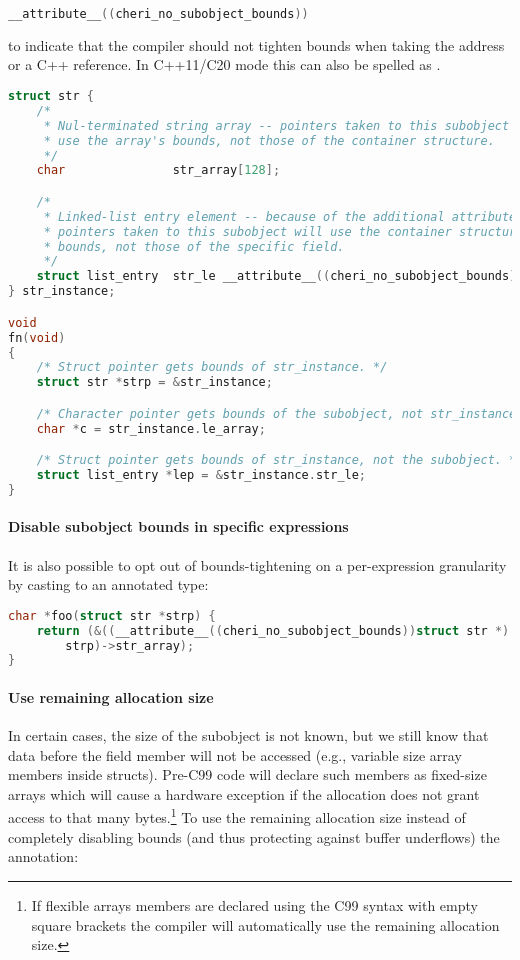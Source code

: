 \documentclass[12pt,twoside,openright,a4paper]{article}
\newcommand{\ccode}[1]{{\small\ttfamily{#1}}}
\newcommand{\cxxcode}[1]{{\ccode{#1}}}
\begin{document}
\begin{lstlisting}[language={C}]
__attribute__((cheri_no_subobject_bounds))
\end{lstlisting}

\noindent
to indicate that the compiler should not tighten bounds when taking the address or a C++ reference. In C++11/C20 mode this can also be spelled as \cxxcode{[[cheri::no\_subobject\_bounds]]}.

\begin{lstlisting}[language={C}]
struct str {
    /*
     * Nul-terminated string array -- pointers taken to this subobject will
     * use the array's bounds, not those of the container structure.
     */
    char               str_array[128];

    /*
     * Linked-list entry element -- because of the additional attribute,
     * pointers taken to this subobject will use the container structure's
     * bounds, not those of the specific field.
     */
    struct list_entry  str_le __attribute__((cheri_no_subobject_bounds));
} str_instance;

void
fn(void)
{
    /* Struct pointer gets bounds of str_instance. */
    struct str *strp = &str_instance;

    /* Character pointer gets bounds of the subobject, not str_instance. */
    char *c = str_instance.le_array;

    /* Struct pointer gets bounds of str_instance, not the subobject. */
    struct list_entry *lep = &str_instance.str_le;
}
\end{lstlisting}

\paragraph{Disable subobject bounds in specific expressions}
It is also possible to opt out of bounds-tightening on a per-expression
granularity by casting to an annotated type:

\begin{lstlisting}[language={C}]
char *foo(struct str *strp) {
    return (&((__attribute__((cheri_no_subobject_bounds))struct str *)
        strp)->str_array);
}
\end{lstlisting}

\paragraph{Use remaining allocation size}
In certain cases, the size of the subobject is not known, but we still know that data
before the field member will not be accessed (e.g., variable size array members
inside structs).
Pre-C99 code will declare such members as fixed-size arrays which will cause
a hardware exception if the allocation does not grant access to that many bytes.\footnote{%
If flexible arrays members are declared using the C99 syntax with empty square
brackets the compiler will automatically use the remaining allocation size.}
To use the remaining allocation size instead of completely disabling bounds
(and thus protecting against buffer underflows) the annotation:
\end{document}
